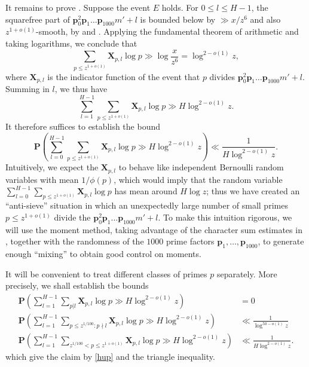 \documentclass[12pt]{amsart}
\renewcommand{\P}{\mathbf{P}}
\begin{document}
It remains to prove . Suppose the event $E$ holds.  For $0 \leq l \leq H-1$, the squarefree part of $\mathbf{p}_{0}^2 \mathbf{p}_{1} \dots \mathbf{p}_{1000} m' + l$ is bounded below by $\gg x/z^6$ and also $z^{1+o(1)}$-smooth, by  and .  Applying the fundamental theorem of arithmetic and taking logarithms, we conclude that
$$ \sum_{p \leq z^{1+o(1)}} \mathbf{X}_{p,l} \log p \gg \log \frac{x}{z^6} = \log^{2-o(1)} z,$$
where $\mathbf{X}_{p,l}$ is the indicator function of the event that $p$ divides $\mathbf{p}_{0}^2 \mathbf{p}_{1} \dots \mathbf{p}_{1000} m' + l$.  Summing in $l$, we thus have
$$ \sum_{l=1}^{H-1} \sum_{p \leq z^{1+o(1)}} \mathbf{X}_{p,l} \log p \gg H \log^{2-o(1)} z.$$
It therefore suffices to establish the bound
$$ \P \left( \sum_{l=0}^{H-1} \sum_{p \leq z^{1+o(1)}} \mathbf{X}_{p,l} \log p \gg H \log^{2-o(1)} z \right) \ll \frac{1}{H \log^{2-o(1)} z}.$$
Intuitively, we expect the $\mathbf{X}_{p,l}$ to behave like independent Bernoulli random variables with mean $1/\phi(p)$, which would imply that the random variable $\sum_{l=0}^{H-1} \sum_{p \leq z^{1+o(1)}} \mathbf{X}_{p,l} \log p$ has mean around $H \log z$; thus we have created an ``anti-sieve'' situation in which an unexpectedly large number of small primes $p \leq z^{1+o(1)}$ divide the $\mathbf{p}_{0}^2 \mathbf{p}_{1} \dots \mathbf{p}_{1000} m' + l$.  To make this intuition rigorous, we will use the moment method, taking advantage of the character sum estimates in , together with the randomness of the $1000$ prime factors $\mathbf{p}_1,\dots,\mathbf{p}_{1000}$, to generate enough ``mixing'' to obtain good control on moments.

It will be convenient to treat different classes of primes $p$ separately.  More precisely, we shall establish tbe bounds
\begin{align}
     \P \left( \sum_{l=1}^{H-1} \sum_{p | l} \mathbf{X}_{p,l} \log p \gg H \log^{2-o(1)} z \right) &= 0\label{excep-prime}\\
     \P \left( \sum_{l=1}^{H-1} \sum_{p \leq z^{1/100}: p \nmid l} \mathbf{X}_{p,l} \log p \gg H \log^{2-o(1)} z \right) &\ll \frac{1}{\log^{50-o(1)} z}\label{small-prime}\\
     \P \left( \sum_{l=1}^{H-1} \sum_{z^{1/100} < p \leq z^{1+o(1)}} \mathbf{X}_{p,l} \log p \gg H \log^{2-o(1)} z \right) &\ll \frac{1}{H \log^{2-o(1)} z}.\label{large-prime}
\end{align}
which give the claim by \eqref{hup} and the triangle inequality.
\end{document}

